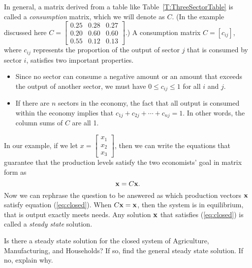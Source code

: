 In general, a matrix derived from a table like Table~\ref{T:ThreeSectorTable} is called a \emph{consumption} matrix, which we will denote as $C$. (In the example discussed here $C = \left[\begin{array}{ccc} 0.25 & 0.28 & 0.27 \\ 0.20 &0.60 &0.60 \\ 0.55 &0.12 &0.13 \end{array}\right]$.)  A consumption matrix $C = [c_{ij}]$, where $c_{ij}$ represents the proportion of the output of sector $j$ that is consumed by sector $i$, satisfies two important properties.
\begin{itemize}
\item Since no sector can consume a negative amount or an amount that exceeds the output of another sector, we must have $0 \leq c_{ij} \leq 1$ for all $i$ and $j$.
\item If there are $n$ sectors in the economy, the fact that all output is consumed within the economy implies that $c_{1j}+c_{2j}+ \cdots + c_{nj} = 1$. In other words, the column sums of $C$ are all 1. 
\end{itemize}
In our example, if we let $x = \left[\begin{array}{c} x_1 \\ x_2 \\ x_3 \end{array}\right]$, then we can write the equations that guarantee that the production levels satisfy the two economists' goal in matrix form as
\begin{equation} \label{eq:closed}
\mathbf{x} = C\mathbf{x}.
\end{equation}
Now we can rephrase the question to be answered as which production vectors $\mathbf{x}$ satisfy equation (\ref{eq:closed}). When $C\mathbf{x} = \mathbf{x}$, then the system is in equilibrium, that is output exactly meets needs. Any solution $\mathbf{x}$ that satisfies (\ref{eq:closed}) is called a \emph{steady state} solution.

\begin{pactivity} Is there a steady state solution for the closed system of Agriculture, Manufacturing, and Households? If so, find the general steady state solution. If no, explain why.


\end{pactivity}

